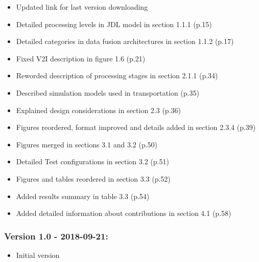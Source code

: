 \begin{titlepage}
	\begin{itemize}
	\item Updated link for last version downloading
	\item Detailed processing levels in JDL model  in section 1.1.1 (p.15)
	\item Detailed categories in data fusion architectures in section 1.1.2 (p.17)
	\item Fixed V2I description in figure 1.6 (p.21)
	\item Reworded description of processing stages in section 2.1.1 (p.34)
	\item Described simulation models used in transportation (p.35)
	\item Explained design considerations in section 2.3 (p.36)
	\item Figures reordered, format improved and details added in section 2.3.4 (p.39)
	\item Figures merged in sections 3.1 and 3.2 (p.50)
	\item Detailed Test configurations in section 3.2 (p.51)
	\item Figures and tables reordered in section 3.3 (p.52)
	\item Added results summary in table 3.3 (p.54)
	\item Added detailed information about contributions in section 4.1 (p.58)
	\end{itemize}


\subsubsection*{Version 1.0 - 2018-09-21:}
	\begin{itemize}
	\item Initial version
	\end{itemize}


\end{titlepage}